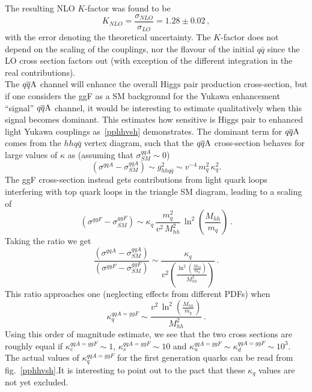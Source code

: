 The resulting NLO $K$-factor was found to be
\begin{equation}
	K_{NLO}=\frac{\sigma_{NLO}}{\sigma_{LO}} = 1.28 \pm 0.02\,,
\end{equation}
with the error denoting the theoretical uncertainty.
The $K$-factor does not depend on the scaling of the couplings, nor the flavour of the initial $q \bar q$ since the LO cross section factors out (with exception of the different integration in the real contributions). \\
The $q\overline q \rm A$ channel will enhance the overall Higgs pair production cross-section, but if one considers the ggF as a SM background for the Yukawa enhancement  ``signal'' $q\overline q \rm A$ channel, it would be interesting to estimate qualitatively when this signal becomes dominant. This estimates how sensitive is Higgs pair to enhanced light Yukawa couplings as~\autoref{pphhvsh} demonstrates.
The dominant term for  $q\overline q \rm A$ comes from the $hh q \bar q$ vertex diagram, such that the $q\overline q \rm A$ cross-section behaves for large values of $\kappa$ as (assuming that $ \sigma^{qqA}_{SM}\sim 0 $)
\begin{equation}
	(\sigma^{qqA}-\sigma^{qqA}_{SM}) \sim  g_{hh q \bar q}^2 \sim v^{-4}\,{m_q^2\,\kappa_q^2}.
\end{equation}
The ggF cross-section instead gets contributions from light quark loops interfering with top quark loops in the triangle SM diagram,  leading to a scaling of
\begin{equation}
	(\sigma^{ggF} - \sigma^{ggF}_{SM} ) \sim  \kappa_q\, \frac{m_q^2}{ v^2\,M_{hh}^2}\,\ln^2{\left(\frac{M_{hh}}{m_q}\right)}\,.
\end{equation}
Taking the ratio we get
\begin{equation}
	\frac{(\sigma^{qqA}-\sigma^{qqA}_{SM})}{(\sigma^{ggF} - \sigma^{ggF}_{SM} )} \sim  \frac{\kappa_q}{ v^2\left(\frac{
			\ln^2{\left(\frac{M_{hh}}{m_q}\right)}}{M_{hh}^2}\right)}\,.
\end{equation}
This ratio approaches one (neglecting effects from different PDFs) when
\begin{equation}
	\kappa_q^{qqA = ggF} \sim  \frac{v^2\,\ln^2{\left(\frac{M_{hh}}{m_q}\right)}}{M_{hh}^2}\,.
\end{equation}
Using this order of magnitude estimate, we see that  the two cross sections are roughly equal if $\kappa_c^{qqA = ggF} \sim 1$, $\kappa_s^{qqA = ggF} \sim 10$ and $\kappa_u^{qqA = ggF} \sim \kappa_d^{qqA = ggF} \sim 10^3$.
The actual values of $\kappa_q^{qqA = ggF}$ for the first generation quarks can be read from fig.~\ref{pphhvsh}.It is interesting to point out to the pact that these $\kappa_q$ values are not yet excluded.
